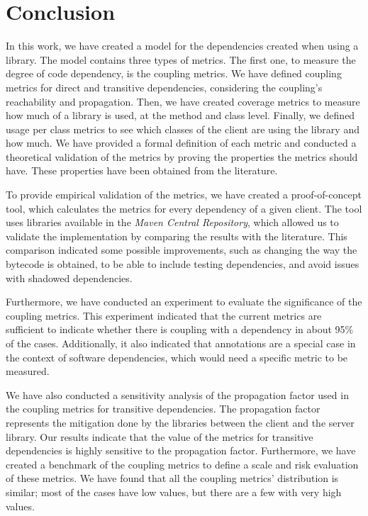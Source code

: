 \chapter{Conclusion}\label{ch:Conclusion}

In this work, we have created a model for the dependencies created when using a library. The model contains three types of metrics. The first one, to measure the degree of code dependency, is the coupling metrics. We have defined coupling metrics for direct and transitive dependencies, considering the coupling's reachability and propagation. Then, we have created coverage metrics to measure how much of a library is used, at the method and class level. Finally, we defined usage per class metrics to see which classes of the client are using the library and how much. We have provided a formal definition of each metric and conducted a theoretical validation of the metrics by proving the properties the metrics should have. These properties have been obtained from the literature.

To provide empirical validation of the metrics, we have created a proof-of-concept tool, which calculates the metrics for every dependency of a given client. The tool uses libraries available in the \textit{Maven Central Repository}, which allowed us to validate the implementation by comparing the results with the literature. This comparison indicated some possible improvements, such as changing the way the bytecode is obtained, to be able to include testing dependencies, and avoid issues with shadowed dependencies.

Furthermore, we have conducted an experiment to evaluate the significance of the coupling metrics. This experiment indicated that the current metrics are sufficient to indicate whether there is coupling with a dependency in about 95\% of the cases. Additionally, it also indicated that annotations are a special case in the context of software dependencies, which would need a specific metric to be measured.

We have also conducted a sensitivity analysis of the propagation factor used in the coupling metrics for transitive dependencies. The propagation factor represents the mitigation done by the libraries between the client and the server library. Our results indicate that the value of the metrics for transitive dependencies is highly sensitive to the propagation factor. Furthermore, we have created a benchmark of the coupling metrics to define a scale and risk evaluation of these metrics. We have found that all the coupling metrics' distribution is similar; most of the cases have low values, but there are a few with very high values.

